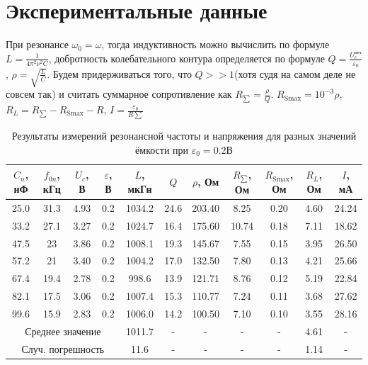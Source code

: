 \section*{Экспериментальные данные}

\indent При резонансе $\omega_0 = \omega$, тогда индуктивность можно вычислить по формуле $L = \frac{1}{4 \pi^2 \nu^2 C}$, добротность колебательного контура определяется по формуле $Q = \frac{U_c^{\text{рез}}}{\varepsilon_0}$, $\rho = \sqrt{\frac{L}{C}}$. Будем придерживаться того, что $Q >> 1$(хотя судя на самом деле не совсем так) и считать суммарное сопротивление как $R_{\sum} = \frac{\rho}{Q}$.
$R_{\text{Smax}} = 10^{-3}\rho$, $R_L = R_{\sum} - R_{\text{Smax}} - R$, $I = \frac{\varepsilon_0}{R{\sum}}$
\begin{table}[h!]
    \centering
    \begin{tabular}{|c|c|c|c|c|c|c|c|c|c|c|}
        \hline
        $C_n$, нФ & $f_{0n}$, кГц & $U_c$, В & $\varepsilon$, В & $L$, мкГн & $Q$ & $\rho$, Ом & $R_{\sum}$, Ом & $R_{\text{Smax}}$, Ом & $R_L$, Ом & $I$, мА\\\hline
        25.0 & 31.3 & 4.93 & 0.2 & 1034.2& 24.6 & 203.40 & 8.25  & 0.20 & 4.60 & 24.24 \\\hline          
        33.2 & 27.1 & 3.27 & 0.2 & 1024.7& 16.4 & 175.60 & 10.74 & 0.18 & 7.11 & 18.62 \\\hline
        47.5 & 23   & 3.86 & 0.2 & 1008.1& 19.3 & 145.67 & 7.55  & 0.15 & 3.95 & 26.50 \\\hline
        57.2 & 21   & 3.40 & 0.2 & 1004.2& 17.0 & 132.50 & 7.80  & 0.13 & 4.21 & 25.66 \\\hline      
        67.4 & 19.4 & 2.78 & 0.2 &  998.6& 13.9 & 121.71 & 8.76  & 0.12 & 5.19 & 22.84 \\\hline
        82.1 & 17.5 & 3.06 & 0.2 & 1007.4& 15.3 & 110.77 & 7.24  & 0.11 & 3.68 & 27.62 \\\hline
        99.6 & 15.9 & 2.83 & 0.2 & 1006.0& 14.2 & 100.50 & 7.10  & 0.10 & 3.55 & 28.16 \\\hline
        \multicolumn{4}{|c|}{Среднее значение}  & 1011.7 & - & - & - & - & 4.61 & -       \\\hline
        \multicolumn{4}{|c|}{Случ. погрешность} &  11.6   & - & - & - & - & 1.14 & -      \\\hline
    \end{tabular}
    \caption{Результаты измерений резонансной частоты и напряжения для разных значений ёмкости при $\varepsilon_0 = 0.2$В}
\end{table}

